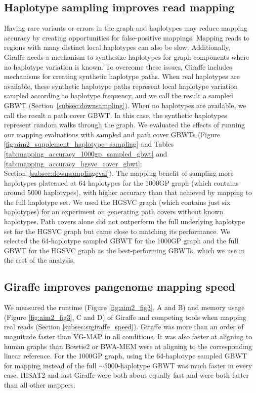 \documentclass[11pt]{ucscthesis}
\begin{document}
\subsection{Haplotype sampling improves read mapping}
Having rare variants or errors in the graph and haplotypes may reduce mapping accuracy by creating opportunities for false-positive mappings\cite{Pritt2018}.
Mapping reads to regions with many distinct local haplotypes can also be slow.
Additionally, Giraffe needs a mechanism to synthesize haplotypes for graph components where no haplotype variation is known.
To overcome these issues, Giraffe includes mechanisms for creating synthetic haplotype paths.
When real haplotypes are available, these synthetic haplotype paths represent local haplotype variation sampled according to haplotype frequency, and we call the result a sampled GBWT (Section~\ref{subsec:downsampling}).
When no haplotypes are available, we call the result a path cover GBWT.
In this case, the synthetic haplotypes represent random walks through the graph. We evaluated the effects of running our mapping evaluations with sampled and path cover GBWTs (Figure \ref{fig:aim2_supplement_haplotype_sampling} and Tables \ref{tab:mapping_accuracy_1000gp_sampled_gbwt} and \ref{tab:mapping_accuracy_hgsvc_cover_gbwt}; Section~\ref{subsec:downsamplingeval}).
The mapping benefit of sampling more haplotypes plateaued at 64 haplotypes for the 1000GP graph (which contains around 5000 haplotypes), with higher accuracy than that achieved by mapping to the full haplotype set.
We used the HGSVC graph (which contains just six haplotypes) for an experiment on generating path covers without known haplotypes.
Path covers alone did not outperform the full underlying haplotype set for the HGSVC graph but came close to matching its performance.
We selected the 64-haplotype sampled GBWT for the 1000GP graph and the full GBWT for the HGSVC graph as the best-performing GBWTs, which we use in the rest of the analysis.

\subsection{Giraffe improves pangenome mapping speed}
We measured the runtime (Figure \ref{fig:aim2_fig3}, A and B) and memory usage (Figure \ref{fig:aim2_fig3}, C and D) of Giraffe and competing tools when mapping real reads (Section \ref{subsec:srgiraffe_speed}).
Giraffe was more than an order of magnitude faster than VG-MAP in all conditions.
It was also faster at aligning to human graphs than Bowtie2 or BWA-MEM were at aligning to the corresponding linear reference.
For the 1000GP graph, using the 64-haplotype sampled GBWT for mapping instead of the full $\sim$5000-haplotype GBWT was much faster in every case.
HISAT2 and fast Giraffe were both about equally fast and were both faster than all other mappers.
\end{document}

